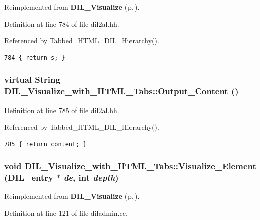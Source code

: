 Reimplemented from {\bf DIL\_\-Visualize} {\rm (p.\,\pageref{classDIL__Visualize_a7})}.

Definition at line 784 of file dil2al.hh.

Referenced by Tabbed\_\-HTML\_\-DIL\_\-Hierarchy().



\footnotesize\begin{verbatim}784 { return s; }
\end{verbatim}\normalsize 
{}
\subsubsection{\setlength{\rightskip}{0pt plus 5cm}virtual {\bf String} DIL\_\-Visualize\_\-with\_\-HTML\_\-Tabs::Output\_\-Content ()\hspace{0.3cm}{\tt  [inline, virtual]}}\label{classDIL__Visualize__with__HTML__Tabs_a5}




Definition at line 785 of file dil2al.hh.

Referenced by Tabbed\_\-HTML\_\-DIL\_\-Hierarchy().



\footnotesize\begin{verbatim}785 { return content; }
\end{verbatim}\normalsize 
{}
\subsubsection{\setlength{\rightskip}{0pt plus 5cm}void DIL\_\-Visualize\_\-with\_\-HTML\_\-Tabs::Visualize\_\-Element ({\bf DIL\_\-entry} $\ast$ {\em de}, int {\em depth})\hspace{0.3cm}{\tt  [virtual]}}\label{classDIL__Visualize__with__HTML__Tabs_a2}




Reimplemented from {\bf DIL\_\-Visualize} {\rm (p.\,\pageref{classDIL__Visualize_a5})}.

Definition at line 121 of file diladmin.cc.

